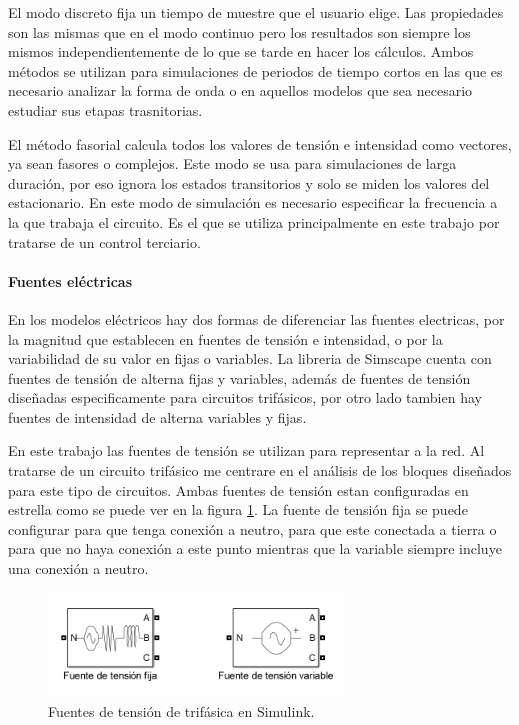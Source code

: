 \documentclass{book}
\begin{document}
El modo discreto fija un tiempo de muestre que el usuario elige. Las propiedades son las mismas que en el modo continuo pero los resultados son siempre los mismos independientemente de lo que se tarde en hacer los c\'alculos. Ambos m\'etodos se utilizan para simulaciones de periodos de tiempo cortos en las que es necesario analizar la forma de onda o en aquellos modelos que sea necesario estudiar sus etapas trasnitorias. \par

El m\'etodo fasorial calcula todos los valores de tensi\'on e intensidad como vectores, ya sean fasores o complejos. Este modo se usa para simulaciones de larga duraci\'on, por eso ignora los estados transitorios y solo se miden los valores del estacionario. En este modo de simulaci\'on es necesario especificar la frecuencia a la que trabaja el circuito. Es el que se utiliza principalmente en este trabajo por tratarse de un control terciario. \par

		\paragraph {Fuentes el\'ectricas}
En los modelos el\'ectricos hay dos formas de diferenciar las fuentes electricas, por la magnitud que establecen en fuentes de tensi\'on e intensidad, o por la variabilidad de su valor en fijas o variables. La libreria de Simscape cuenta con fuentes de tensi\'on de alterna fijas y variables, además de fuentes de tensi\'on diseñadas especificamente para circuitos trif\'asicos, por otro lado tambien hay fuentes de intensidad de alterna variables y fijas. \par

En este trabajo las fuentes de tensi\'on se utilizan para representar a la red. Al tratarse de un circuito trif\'asico me centrare en el an\'alisis de los bloques diseñados para este tipo de circuitos. Ambas fuentes de tensi\'on estan configuradas en estrella como se puede ver en la figura \ref{VoltageSources}. La fuente de tensi\'on fija se puede configurar para que tenga conexi\'on a neutro, para que este conectada a tierra o para que no haya conexi\'on a este punto mientras que la variable siempre incluye una conexi\'on a neutro. \par

\begin{figure}[h!]
\centering
\includegraphics[width=0.7\textwidth]{VoltageSources.PNG}
\caption{Fuentes de tensi\'on de trif\'asica en Simulink. }
\label{VoltageSources}
\end{figure} \par
\end{document}
